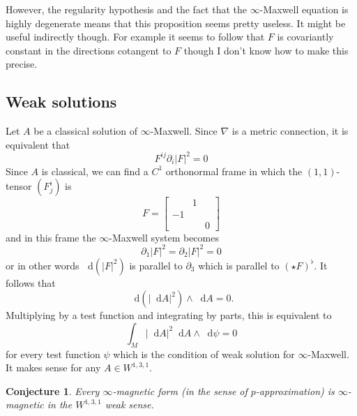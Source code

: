 \documentclass[reqno,11pt]{amsart}
\newcommand*\dif{\mathop{}\!\mathrm{d}}
\newtheorem{conjecture}[theorem]{Conjecture}
\theoremstyle{definition}
\numberwithin{equation}{section}
\begin{document}
However, the regularity hypothesis and the fact that the $\infty$-Maxwell equation is highly degenerate means that this proposition seems pretty useless.
It might be useful indirectly though.
For example it seems to follow that $F$ is covariantly constant in the directions cotangent to $F$ though I don't know how to make this precise.

\subsection{Weak solutions}
Let $A$ be a classical solution of $\infty$-Maxwell. Since $\nabla$ is a metric connection, it is equivalent that 
$$F^{ij} \partial_i |F|^2 = 0$$
Since $A$ is classical, we can find a $C^1$ orthonormal frame in which the $(1, 1)$-tensor $(F^i_j)$ is
$$F = \begin{bmatrix}& 1 \\ -1 \\ && 0\end{bmatrix}$$
and in this frame the $\infty$-Maxwell system becomes 
$$\partial_1 |F|^2 = \partial_2 |F|^2 = 0$$
or in other words $\dif(|F|^2)$ is parallel to $\partial_3$ which is parallel to $(\star F)^\flat$.
It follows that
$$\dif(|\dif A|^2) \wedge \dif A = 0.$$
Multiplying by a test function and integrating by parts, this is equivalent to 
$$\int_M |\dif A|^2 \dif A \wedge \dif \psi = 0$$
for every test function $\psi$ which is the condition of weak solution for $\infty$-Maxwell.
It makes sense for any $A \in W^{1, 3, 1}$.

\begin{conjecture}
Every $\infty$-magnetic form (in the sense of $p$-approximation) is $\infty$-magnetic in the $W^{1, 3, 1}$ weak sense.
\end{conjecture}
\end{document}
